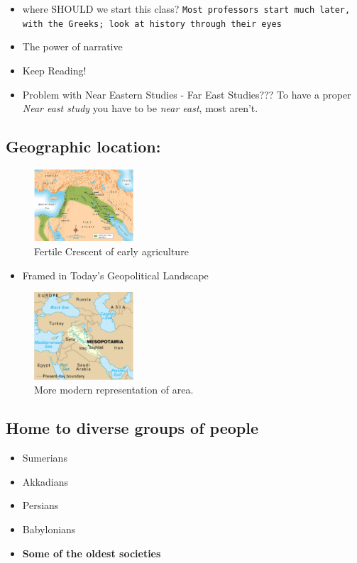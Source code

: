 \documentclass[11pt]{article}
\begin{document}
\begin{itemize}
\item where SHOULD we start this class?
        \texttt{Most professors start much later, with the Greeks; look at history through their eyes}
\item The power of narrative
\item Keep Reading!
\item Problem with Near Eastern Studies - Far East Studies???
        To have a proper \emph{Near east study} you have to be \emph{near east}, most aren't.
\end{itemize}
\subsection{Geographic location:}
\label{sec-3.3}

\begin{figure}[htb]
\centering
\includegraphics[width=10em]{./img/fertileCrescent.png}
\caption{Fertile Crescent of early agriculture}
\end{figure}

\begin{itemize}
\item Framed in Today's Geopolitical Landscape
\end{itemize}
\begin{figure}[htb]
\centering
\includegraphics[width=10em]{./img/GeoLand.png}
\caption{More modern representation of area.}
\end{figure}

\subsection{Home to diverse groups of people}
\label{sec-3.4}

\begin{itemize}
\item Sumerians
\item Akkadians
\item Persians
\item Babylonians
\item \textbf{Some of the oldest societies}
\end{itemize}
\end{document}

